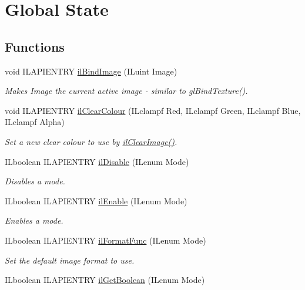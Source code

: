 \hypertarget{group__state}{\section{Global State}
\label{group__state}
}
\subsection*{Functions}
\begin{DoxyCompactItemize}
\item 
void I\-L\-A\-P\-I\-E\-N\-T\-R\-Y \hyperlink{group__state_ga1ee59d3004b3fdd25e91da8e41708035}{il\-Bind\-Image} (I\-Luint Image)
\begin{DoxyCompactList}\small\item\em Makes Image the current active image -\/ similar to gl\-Bind\-Texture(). \end{DoxyCompactList}\item 
\hypertarget{group__state_gaca1dc7f7b8e61eb134060c9c8a8b72f2}{void I\-L\-A\-P\-I\-E\-N\-T\-R\-Y \hyperlink{group__state_gaca1dc7f7b8e61eb134060c9c8a8b72f2}{il\-Clear\-Colour} (I\-Lclampf Red, I\-Lclampf Green, I\-Lclampf Blue, I\-Lclampf Alpha)}\label{group__state_gaca1dc7f7b8e61eb134060c9c8a8b72f2}

\begin{DoxyCompactList}\small\item\em Set a new clear colour to use by \hyperlink{group__image__manip_gae48d76d54f6f00fe54b304c29224653f}{il\-Clear\-Image()}. \end{DoxyCompactList}\item 
I\-Lboolean I\-L\-A\-P\-I\-E\-N\-T\-R\-Y \hyperlink{group__state_ga4b5f72e2b4f6b197efed3a64646a6651}{il\-Disable} (I\-Lenum Mode)
\begin{DoxyCompactList}\small\item\em Disables a mode. \end{DoxyCompactList}\item 
I\-Lboolean I\-L\-A\-P\-I\-E\-N\-T\-R\-Y \hyperlink{group__state_gafa976322d840e3ffa8e0076ecff51b2b}{il\-Enable} (I\-Lenum Mode)
\begin{DoxyCompactList}\small\item\em Enables a mode. \end{DoxyCompactList}\item 
I\-Lboolean I\-L\-A\-P\-I\-E\-N\-T\-R\-Y \hyperlink{group__state_gacc97a458c5ba4562e32f0e8c446b3106}{il\-Format\-Func} (I\-Lenum Mode)
\begin{DoxyCompactList}\small\item\em Set the default image format to use. \end{DoxyCompactList}\item 
\hypertarget{group__state_ga57d539fb2bdaacd8c6eec5d7e732e6e3}{I\-Lboolean I\-L\-A\-P\-I\-E\-N\-T\-R\-Y \hyperlink{group__state_ga57d539fb2bdaacd8c6eec5d7e732e6e3}{il\-Get\-Boolean} (I\-Lenum Mode)}\label{group__state_ga57d539fb2bdaacd8c6eec5d7e732e6e3}


\end{DoxyCompactItemize}
